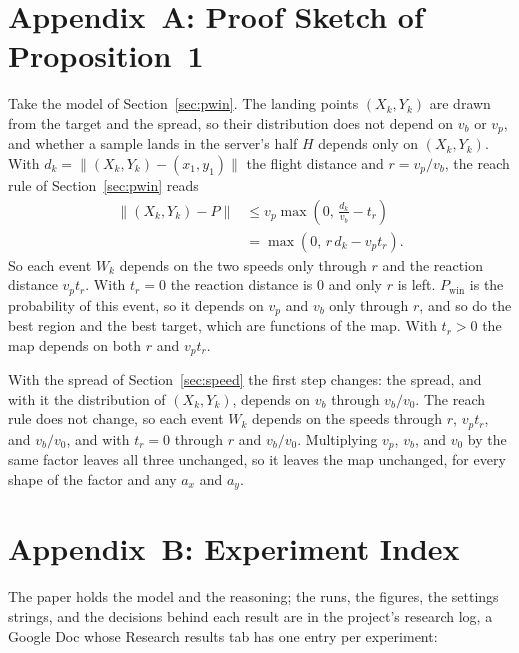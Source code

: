   \section*{Appendix~A: Proof Sketch of Proposition~1}

  Take the model of Section~\ref{sec:pwin}. The landing points $(X_k, Y_k)$ are
  drawn from the target and the spread, so their distribution does not depend
  on $v_b$ or $v_p$, and whether a sample lands in the server's half $H$
  depends only on $(X_k, Y_k)$. With $d_k = \lVert (X_k, Y_k) - (x_1, y_1)
  \rVert$ the flight distance and $r = v_p / v_b$, the reach rule of
  Section~\ref{sec:pwin} reads
  \begin{equation}
  \begin{aligned}
  \lVert (X_k, Y_k) - P \rVert
  &\le v_p \max\left(0, \, \frac{d_k}{v_b} - t_r\right) \\
  &= \max(0, \, r \, d_k - v_p t_r) .
  \end{aligned}
  \end{equation}
  So each event $W_k$ depends on the two speeds only through $r$ and the
  reaction distance $v_p t_r$. With $t_r = 0$ the reaction distance is 0 and
  only $r$ is left. $P_{\mathrm{win}}$ is the probability of this event, so it
  depends on $v_p$ and $v_b$ only through $r$, and so do the best region and
  the best target, which are functions of the map. With $t_r > 0$ the map
  depends on both $r$ and $v_p t_r$.

  With the spread of Section~\ref{sec:speed} the first step changes: the
  spread, and with it the distribution of $(X_k, Y_k)$, depends on $v_b$ through
  $v_b / v_0$. The reach rule does not change, so each event $W_k$ depends on
  the speeds through $r$, $v_p t_r$, and $v_b / v_0$, and with $t_r = 0$ through
  $r$ and $v_b / v_0$. Multiplying $v_p$, $v_b$, and $v_0$ by the same factor
  leaves all three unchanged, so it leaves the map unchanged, for every shape of
  the factor and any $a_x$ and $a_y$.

  \section*{Appendix~B: Experiment Index}

  The paper holds the model and the reasoning; the runs, the figures, the
  settings strings, and the decisions behind each result are in the project's
  research log, a Google Doc whose Research results tab has one entry per
  experiment:

